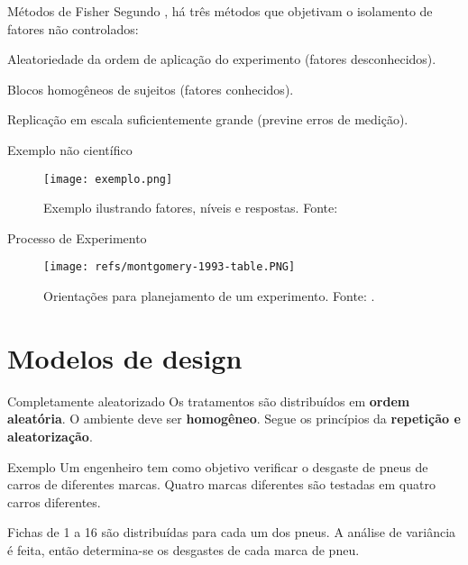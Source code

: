 \documentclass[aspectratio=43,10pt]{beamer}
\begin{document}
\begin{frame}{Métodos de Fisher}
    Segundo , há três métodos que objetivam o isolamento de fatores
    não controlados:
    \begin{exampleblock}{Aleatoriedade}
        da ordem de aplicação do experimento (fatores desconhecidos).
    \end{exampleblock}
    \begin{exampleblock}{Blocos}
        homogêneos de sujeitos (fatores conhecidos).
    \end{exampleblock}
    \begin{exampleblock}{Replicação}
        em escala suficientemente grande (previne erros de medição).
    \end{exampleblock}
\end{frame}

\begin{frame}{Exemplo não científico}
    \begin{figure}
      \centering
      \texttt{[image: exemplo.png]}
      \caption{Exemplo ilustrando fatores, níveis e respostas. Fonte: }
    \end{figure}
\end{frame}
\begin{frame}[fragile]{Processo de Experimento}
    \begin{figure}
      \centering
      \texttt{[image: refs/montgomery-1993-table.PNG]}
      \caption{Orientações para planejamento de um experimento. Fonte: .}
    \end{figure}
\end{frame}

\section{Modelos de design}

\begin{frame}{Completamente aleatorizado}
    Os tratamentos são distribuídos em \textbf{ordem aleatória}.
    O ambiente deve ser \textbf{homogêneo}. Segue os princípios da \textbf{repetição e aleatorização}.
    
    \begin{exampleblock}{Exemplo}
    Um engenheiro tem como objetivo verificar o desgaste de pneus de carros de diferentes marcas.
    Quatro marcas diferentes são testadas em quatro carros diferentes.
    
    Fichas de 1 a 16 são distribuídas para cada um dos pneus.
    A análise de variância é feita, então determina-se os desgastes de cada marca de pneu.
    \end{exampleblock}
      
\end{frame}
\end{document}
